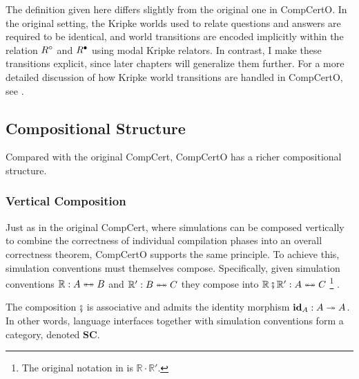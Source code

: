 \begin{remark}
  The definition given here differs slightly
  from the original one in CompCertO.
  In the original setting,
  the Kripke worlds used to relate questions and answers
  are required to be identical,
  and world transitions are encoded implicitly
  within the relation $R^\circ$ and $R^\bullet$
  using modal Kripke relators.
  In contrast,
  I make these transitions explicit,
  since later chapters will generalize them further.
  For a more detailed discussion of
  how Kripke world transitions are handled in CompCertO, see \cite{compcerto21tr}.
\end{remark}

\subsection{Compositional Structure}
\label{sec:bg:compcert-compose}

Compared with the original CompCert,
CompCertO has a richer compositional structure.

\subsubsection{Vertical Composition}

Just as in the original CompCert,
where simulations can be composed vertically
to combine the correctness of individual compilation phases
into an overall correctness theorem,
CompCertO supports the same principle.
To achieve this, simulation conventions must themselves compose.
Specifically, given simulation conventions
$\mathbb{R} : A \twoheadleftarrow \mathrel{\mkern-15mu} \twoheadrightarrow B$ and
$\mathbb{R}' : B \twoheadleftarrow \mathrel{\mkern-15mu} \twoheadrightarrow C$
they compose into
$\mathbb{R} \fatsemi \mathbb{R}' : A \twoheadleftarrow \mathrel{\mkern-15mu} \twoheadrightarrow C$
\footnote{
  The original notation in \cite{compcerto} is $\mathbb{R} \cdot \mathbb{R}'$.
}
.

\begin{theorem}
  \label{thm:bg:sc}
  The composition $\fatsemi$ is associative
  and admits the identity morphism $\mathbf{id}_A : A \twoheadrightarrow A$.
  In other words,
  language interfaces together with simulation conventions
  form a category, denoted $\mathbf{SC}$.
\end{theorem}

